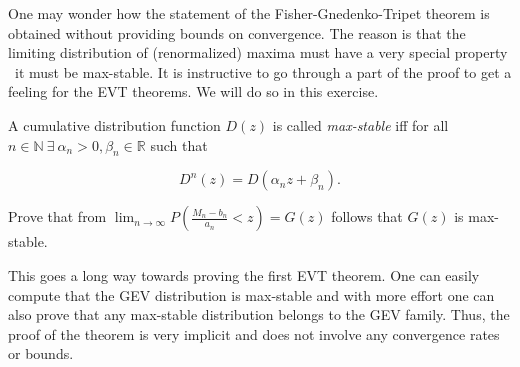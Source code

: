 One may wonder how the statement of the Fisher-Gnedenko-Tripet theorem is
obtained without providing bounds on convergence. The reason is that the
limiting distribution of (renormalized) maxima must have a very special property
\textemdash\ it must be max-stable. It is instructive to go through a part of the proof to
get a feeling for the EVT theorems. We will do so in this exercise.


\begin{definition} 
    A cumulative distribution function $D(z)$ is called \textit{max-stable}
    iff for all $n\in\mathbb{N} \ \exists \ \alpha_n>0, \beta_n \in  \mathbb{R}$
    such that 

    \begin{equation}
        D^n(z) = D(\alpha_n z + \beta_n).    
    \end{equation}

\end{definition}

\medskip

Prove that from $\lim_{n\rightarrow \infty} P\left( \frac{M_n - b_n}{a_n} < z
\right) = G(z)$ follows that $G(z)$ is max-stable.

\medskip

This goes a long way towards proving the first EVT theorem. One can easily
compute that the GEV distribution is max-stable and with more effort one can
also prove that any max-stable distribution belongs to the GEV family. Thus, the
proof of the theorem is very implicit and does not involve any convergence rates
or bounds.
